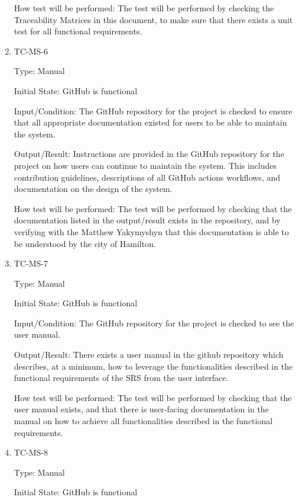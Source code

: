 \documentclass[12pt, titlepage]{article}
\begin{document}
\begin{enumerate}
    How test will be performed: The test will be performed by
    checking the Traceability Matrices in this document, to make sure
    that there exists a unit test for all functional requirements.

  \item{TC-MS-6\\}

    Type: Manual

    Initial State: GitHub is functional

    Input/Condition: The GitHub repository for the project is checked
    to ensure that all appropriate documentation existed for users to
    be able to maintain the system.

    Output/Result: Instructions are provided in the GitHub repository
    for the project on how users can continue to maintain the system.
    This includes contribution guidelines, descriptions of all
    GitHub actions workflows, and documentation on the design of the system.

    How test will be performed: The test will be performed by
    checking that the documentation listed in the output/result
    exists in the repository, and by verifying with the Matthew
    Yakymyshyn that this documentation is able to be understood by
    the city of Hamilton.

  \item{TC-MS-7\\}

    Type: Manual

    Initial State: GitHub is functional

    Input/Condition: The GitHub repository for the project is checked
    to see the user manual.

    Output/Result: There exists a user manual in the github
    repository which describes, at a minimum, how to leverage the
    functionalities described in the functional requirements of the
    SRS from the user interface.

    How test will be performed: The test will be performed by
    checking that the user manual exists, and that there is
    user-facing documentation in the manual on how to achieve all
    functionalities described in the functional requirements.

  \item{TC-MS-8\\}

    Type: Manual

    Initial State: GitHub is functional


\end{enumerate}
\end{document}
